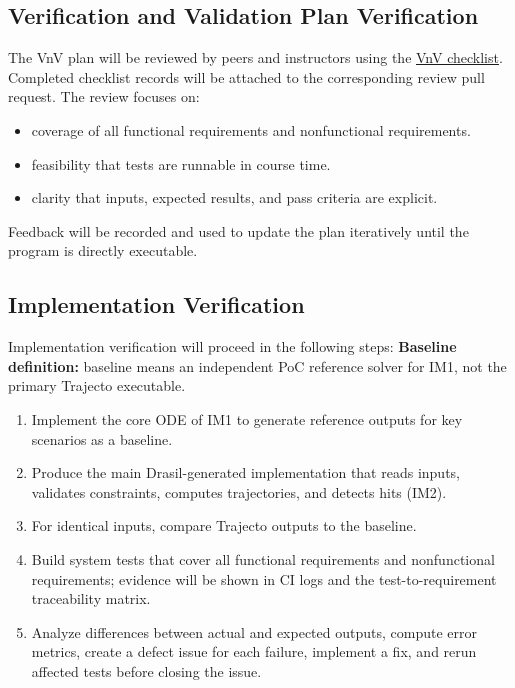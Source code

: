 \documentclass[12pt, titlepage]{article}
\providecommand{\progname}[1]{#1}
\begin{document}
\subsection{Verification and Validation Plan Verification}

The VnV plan will be reviewed by peers and instructors using the
\href{https://github.com/JoeZZG/CAS741/blob/main/docs/Checklists/VnV-Checklist.tex}{VnV checklist}.
Completed checklist records will be attached to the corresponding review pull
request.
The review focuses on:
\begin{itemize}
  \item coverage of all functional requirements and nonfunctional requirements.
  \item feasibility that tests are runnable in course time.
  \item clarity that inputs, expected results, and pass criteria are explicit.
\end{itemize}
Feedback will be recorded and used to update the plan iteratively until the
program is directly executable.

\subsection{Implementation Verification}

Implementation verification will proceed in the following steps:
\textbf{Baseline definition:} baseline means an independent PoC reference
solver for IM1, not the primary \progname{Trajecto} executable.
\begin{enumerate}
  \item Implement the core ODE of IM1 to generate reference outputs for key scenarios as a baseline.
  \item Produce the main Drasil-generated implementation that reads inputs, validates constraints, computes trajectories, and detects hits (IM2).
  \item For identical inputs, compare \progname{Trajecto} outputs to the baseline.
  \item Build system tests that cover all functional requirements and
  nonfunctional requirements; evidence will be shown in CI logs and the
  test-to-requirement traceability matrix.
  \item Analyze differences between actual and expected outputs, compute error
  metrics, create a defect issue for each failure, implement a fix, and rerun
  affected tests before closing the issue.
\end{enumerate}
\end{document}
